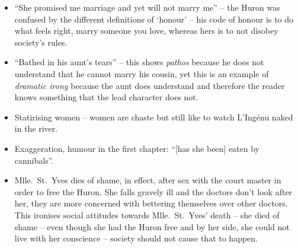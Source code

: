 \documentclass[12pt]{article}
\begin{document}
\begin{itemize}
  \item{``She promised me marriage and yet will not marry me'' -- the Huron was confused by the different definitions of `honour' -- his code of honour is to do what feels right, marry someone you love, whereas hers is to not disobey society's rules.}
  \item{``Bathed in his aunt's tears'' -- this shows \textit{pathos} because he does not understand that he cannot marry his cousin, yet this is an example of \textit{dramatic irony} because the aunt does understand and therefore the reader knows something that the lead character does not.}
  \item{Statirising women -- women are chaste but still like to watch L'Ingénu naked in the river.}
  \item{Exaggeration, humour in the first chapter: ``[has she been] eaten by cannibals''.}
  \item{Mlle.\ St.\ Yves dies of shame, in effect, after sex with the court master in order to free the Huron. She falls gravely ill and the doctors don't look after her, they are more concerned with bettering themselves over other doctors. This ironises social attitudes towards Mlle.\ St.\ Yves' death -- she died of shame -- even though she had the Huron free and by her side, she could not live with her conscience -- society should not cause that to happen.}
\end{itemize}
\end{document}

